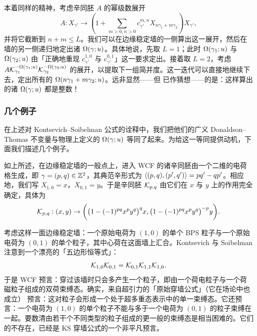 本着同样的精神，考虑辛同胚 $A$ 的幂级数展开
\begin{equation}
A : X_{\gamma'} \to  ( 1 + \sum_{m>0,n>0} c^{m,n}_{\gamma'} X_{n \gamma_1 + m \gamma_2}) X_{\gamma'},
\end{equation}
并将它截断到 $n+m \le L$。我们可以在边缘稳定墙的一侧算出这一展开，然后在墙的另一侧递归地定出诸 $\Omega(\gamma;u)$。具体地说，先取 $L=1$；此时 $\Omega(\gamma_1;u)$ 与 $\Omega(\gamma_2;u)$ 由「正确地重现 $c^{1,0}_{\gamma'}$ 与 $c^{0,1}_{\gamma'}$」这一要求定出。接着取 $L=2$，考虑 $A \mathcal{K}_{\gamma_1}^{-\Omega(\gamma_1;u)} \mathcal{K}_{\gamma_2}^{-\Omega(\gamma_2;u)}$ 的展开，以提取下一组简并度。这一迭代可以直接地继续下去，定出所有的 $\Omega(n \gamma_1 + m \gamma_2 ; u)$。远非显然——但 \cite{ks1} 已作猜想——的是：这样算出的诸 $\Omega(\gamma ; u)$ 都是整数！

\subsubsection*{几个例子}

在上述对 Kontsevich--Soibelman 公式的诠释中，我们把他们的广义 Donaldson--Thomas 不变量与物理上定义的 $\Omega(\gamma;u)$ 等同了起来。为给这一等同提供动机，下面我们描述几个例子。

如上所述，在边缘稳定墙的一般点上，进入 WCF 的诸辛同胚由一个二维的电荷格生成，即 $\gamma = (p,q) \in \mathbb{Z}^2$，其典范辛形式为 $\langle (p,q), (p',q') \rangle = pq' - q p'$。相应地，我们写 $X_{1,0}=x$，$X_{0,1}=y$。于是辛同胚 $\mathcal{K}_{p,q}$ 由它们在 $x$ 与 $y$ 上的作用完全确定，具体为
\begin{equation}
\mathcal{K}_{p,q}: (x,y) \to \biggl(  \bigl(1-(-1)^{pq} x^p y^q \bigr)^q x,
\bigl(1-(-1)^{pq} x^p y^q\bigr)^{-p} y \biggr).
\end{equation}

考虑这样一面边缘稳定墙：一个原始电荷为 $(1,0)$ 的单个 BPS 粒子与一个原始电荷为 $(0,1)$ 的单个粒子，其中心荷在这面墙上汇合。Kontsevich 与 Soibelman 注意到一个漂亮的「五边形恒等式」：
\begin{equation} \label{eq:product-formula-primitive}
\mathcal{K}_{1,0} \mathcal{K}_{0,1} = \mathcal{K}_{0,1} \mathcal{K}_{1,1} \mathcal{K}_{1,0}.
\end{equation}
于是 WCF 预言：穿过该墙时只会多产生一个粒子，即由一个荷电粒子与一个荷磁粒子组成的双荷束缚态。确实，来自超引力的「原始穿墙公式」（它在场论中也成立）\cite{Denef:2007vg} 预言：这对粒子会形成一个处于超多重态表示中的单一束缚态。它还预言：一个电荷为 $(1,0)$ 的单个粒子不能与多于一个电荷为 $(0,1)$ 的粒子束缚在一起。要数清由若干个不同类型的粒子组成的更一般的束缚态是相当困难的。它们的不存在，已经是 KS 穿墙公式的一个非平凡预言。

